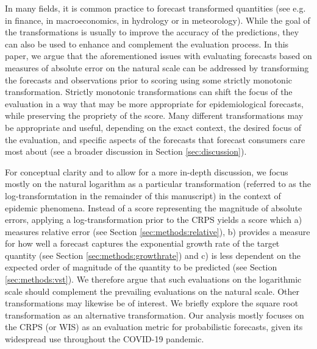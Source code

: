 \documentclass{article}
\begin{document}
In many fields, it is common practice to forecast transformed quantities (see e.g. \cite{taylorEvaluatingVolatilityInterval1999} in finance, \cite{mayrLogLevelVAR2015} in macroeconomics, \cite{loweStochasticRainfallrunoffForecasting2014} in hydrology or \cite{fuglstadDoesNonstationarySpatial2015} in meteorology). While the goal of the transformations is usually to improve the accuracy of the predictions, they can also be used to enhance and complement the evaluation process. 
In this paper, we argue that the aforementioned issues with evaluating forecasts based on measures of absolute error on the natural scale can be addressed by transforming the forecasts and observations prior to scoring using some strictly monotonic transformation. Strictly monotonic transformations can shift the focus of the evaluation in a way that may be more appropriate for epidemiological forecasts, while preserving the propriety of the score. Many different transformations may be appropriate and useful, depending on the exact context, the desired focus of the evaluation, and specific aspects of the forecasts that forecast consumers care most about (see a broader discussion in Section \ref{sec:discussion}). 

For conceptual clarity and to allow for a more in-depth discussion, we focus mostly on the natural logarithm as a particular transformation (referred to as the log-transformtation in the remainder of this manuscript) in the context of epidemic phenomena. Instead of a score representing the magnitude of absolute errors, applying a log-transformation prior to the CRPS yields a score which a) measures relative error (see Section \ref{sec:methods:relative}), b) provides a measure for how well a forecast captures the exponential growth rate of the target quantity (see Section \ref{sec:methods:growthrate}) and c) is less dependent on the expected order of magnitude of the quantity to be predicted (see Section \ref{sec:methods:vst}). %
We therefore argue that such evaluations on the logarithmic scale should complement the prevailing evaluations on the natural scale. 
Other transformations may likewise be of interest. We briefly explore the square root transformation as an alternative transformation. %
Our analysis mostly focuses on the CRPS (or WIS) as an evaluation metric for probabilistic forecasts, given its widespread use throughout the COVID-19 pandemic. 
\end{document}
